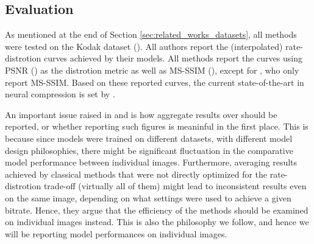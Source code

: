 \subsection{Evaluation}
\par
As mentioned at the end of Section \ref{sec:related_works_datasets}, all
methods were tested on the Kodak dataset (\cite{kodakdataset}). All authors
report the (interpolated) rate-distrotion curves achieved by their models. All
methods report the curves using PSNR (\cite{psnr}) as the distrotion metric as
well as MS-SSIM (\cite{msssim}), except for \cite{rippel2017real}, who only
report MS-SSIM. Based on these reported curves, the current state-of-the-art in
neural compression is set by \cite{balle2018variational}. 
\par
An important issue raised in \cite{balle2016end} and \cite{balle2018variational}
is how aggregate results over should be reported, or whether reporting such
figures is meaninful in the first place. This is because since models were
trained on different datasets, with different model design philosophies, there
might be significant fluctuation in the comparative model performance between
individual images. Furthermore, averaging results achieved by classical methods
that were not directly optimized for the rate-distrotion trade-off (virtually
all of them) might lead to inconsistent results even on the same image, depending on what settings were used to achieve
a given bitrate. Hence, they argue that the efficiency of the methods should
be examined on individual images instead. This is also the philosophy we follow,
and hence we will be reporting model performances on individual images.